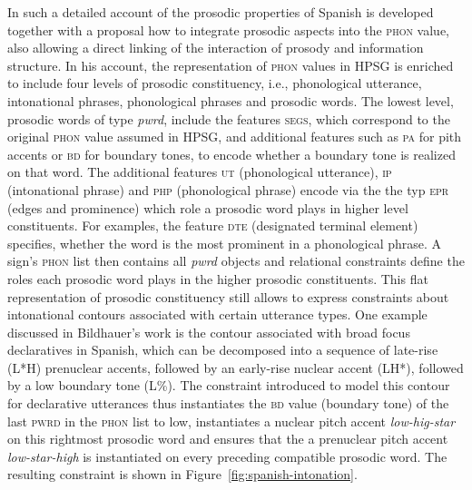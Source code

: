 \documentclass[output=paper]{langsci/langscibook}
\begin{document}
In \cite{Bildhauer2008a} such a detailed account of the prosodic
properties of Spanish is developed together with a proposal how to
integrate prosodic aspects into the \textsc{phon} value, also allowing
a direct linking of the interaction of prosody and information
structure.  In his account, the representation of \textsc{phon} values
in HPSG is enriched to include four levels of prosodic constituency,
i.e., phonological utterance, intonational phrases, phonological
phrases and prosodic words. The lowest level, prosodic words of type
\textit{pwrd}, include the features \textsc{segs}, which correspond to
the original \textsc{phon} value assumed in HPSG, and additional
features such as \textsc{pa} for pith accents or \textsc{bd} for
boundary tones, to encode whether a boundary tone is realized on that
word. The additional features \textsc{ut} (phonological utterance),
\textsc{ip} (intonational phrase) and \textsc{php} (phonological phrase)
encode via the the typ \textsc{epr} (edges and prominence) which role
a prosodic word plays in higher level constituents. For examples, the
feature \textsc{dte} (designated terminal element) specifies, whether
the word is the most prominent in a phonological phrase. A sign's
\textsc{phon} list then contains all \textit{pwrd} objects and
relational constraints define the roles each prosodic word plays in
the higher prosodic constituents. This flat representation of prosodic
constituency still allows to express constraints about intonational
contours associated with certain utterance types. One example
discussed in Bildhauer's work is the contour associated with broad
focus declaratives in Spanish, which can be decomposed into a
sequence of late-rise (L*H) prenuclear accents, followed by an
early-rise nuclear accent (LH*), followed by a low boundary tone
(L\%). The constraint introduced to model this contour for declarative
utterances thus instantiates the \textsc{bd} value (boundary tone) of
the last \textsc{pwrd} in the \textsc{phon} list to low, instantiates
a nuclear pitch accent \textit{low-hig-star} on this rightmost
prosodic word and ensures that the a prenuclear pitch accent
\textit{low-star-high} is instantiated on every preceding compatible
prosodic word. The resulting constraint is shown in
Figure~\ref{fig:spanish-intonation}.
\end{document}
